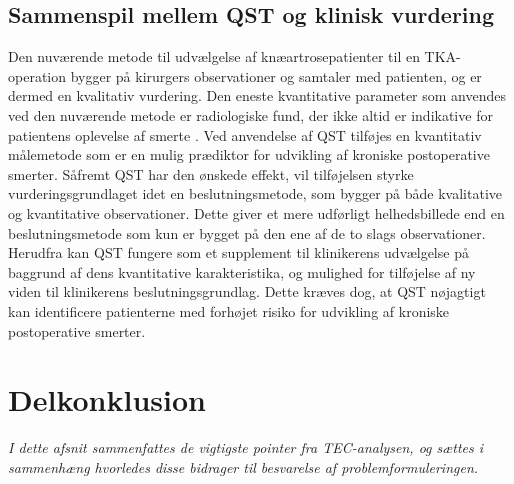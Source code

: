 \subsection{Sammenspil mellem QST og klinisk vurdering} 
Den nuværende metode til udvælgelse af knæartrosepatienter til en TKA-operation bygger på kirurgers observationer og samtaler med patienten, og er dermed en kvalitativ vurdering. \citep{Troelsen2012} \citep{skou2016} Den eneste kvantitative parameter som anvendes ved den nuværende metode er radiologiske fund, der ikke altid er indikative for patientens oplevelse af smerte \citep{Leary2016}. Ved anvendelse af QST tilføjes en kvantitativ målemetode som er en mulig prædiktor for udvikling af kroniske postoperative smerter. Såfremt QST har den ønskede effekt, vil tilføjelsen styrke vurderingsgrundlaget idet en beslutningsmetode, som bygger på både kvalitative og kvantitative observationer. Dette giver et mere udførligt helhedsbillede end en beslutningsmetode som kun er bygget på den ene af de to slags observationer. \citep{Gronmo2012} \\
Herudfra kan QST fungere som et supplement til klinikerens udvælgelse på baggrund af dens kvantitative karakteristika, og mulighed for tilføjelse af ny viden til klinikerens beslutningsgrundlag. Dette kræves dog, at QST nøjagtigt kan identificere patienterne med forhøjet risiko for udvikling af kroniske postoperative smerter.   

\section{Delkonklusion}
\textit{I dette afsnit sammenfattes de vigtigste pointer fra TEC-analysen, og sættes i sammenhæng hvorledes disse bidrager til besvarelse af problemformuleringen.}

